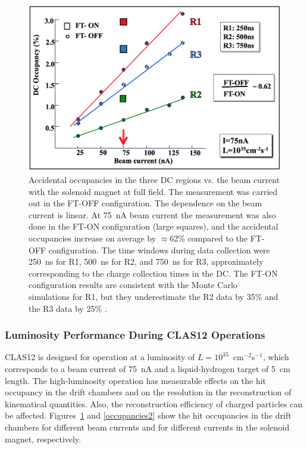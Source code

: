 \documentclass[final,3p,twocolumn]{elsarticle}
\begin{document}
\begin{figure}[htbp!]
\centerline{\includegraphics[width=1.0\columnwidth]{random-occupancies.png}}
\caption{Accidental occupancies in the three DC regions vs. the beam current with the solenoid magnet at full field.
  The measurement was carried out in the FT-OFF configuration. The dependence on the beam current is linear.
  At 75~nA beam current the measurement was also done in the FT-ON configuration (large squares), and the
  accidental occupancies increase on average by $\approx$62\% compared to the FT-OFF configuration. The time
  windows during data collection were 250~ns for R1, 500~ns for R2, and 750~ns for R3, approximately corresponding
  to the charge collection times in the DC. The FT-ON configuration results are consistent with the Monte Carlo
  simulations for R1, but they underestimate the R2 data by 35\% and the R3 data by 25\%
  \cite{GEMC,GEMC-background}.}
\label{occupancies1}
\end{figure}

\subsubsection{Luminosity Performance During CLAS12 Operations}

CLAS12 is designed for operation at a luminosity of $L = 10^{35}$~cm$^{-2}$s$^{-1}$, which corresponds to a beam
current of 75~nA and a liquid-hydrogen target of 5~cm length. The high-luminosity operation has measurable effects
on the hit occupancy in the drift chambers and on the resolution in the reconstruction of kinematical quantities. Also,
the reconstruction efficiency of charged particles can be affected. Figures~\ref{occupancies1} and \ref{occupancies2}
show the hit occupancies in the drift chambers for different beam currents and for different currents in the solenoid
magnet, respectively.
\end{document}
